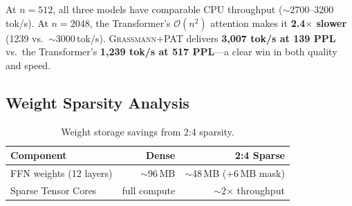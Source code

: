 \documentclass[conference]{IEEEtran}
\newcommand{\grassmann}{\textsc{Grassmann}}
\newcommand{\pat}{\textsc{PAT}}
\newcommand{\bigO}[1]{\ensuremath{\mathcal{O}(#1)}}
\begin{document}
At $n=512$, all three models have comparable CPU throughput
($\sim$2700--3200\,tok/s). At $n=2048$, the Transformer's
$\bigO{n^{2}}$ attention makes it \textbf{2.4$\times$ slower}
(\num{1239} vs.\ $\sim$\num{3000}\,tok/s). \grassmann{}+\pat{}
delivers \textbf{3,007 tok/s at 139 PPL} vs.\ the Transformer's
\textbf{1,239 tok/s at 517 PPL}—a clear win in both quality and speed.

\subsection{Weight Sparsity Analysis}
\label{sec:sparsity}

\begin{table}[htbp]
\centering
\caption{Weight storage savings from 2:4 sparsity.}
\label{tab:sparsity}
\small
\begin{tabular}{@{}lrr@{}}
\toprule
\textbf{Component} & \textbf{Dense} & \textbf{2:4 Sparse} \\
\midrule
FFN weights (12 layers) & $\sim$96\,MB & $\sim$48\,MB (+6\,MB mask) \\
Sparse Tensor Cores     & full compute & $\sim$2$\times$ throughput \\
\bottomrule
\end{tabular}
\end{table}



\end{document}
